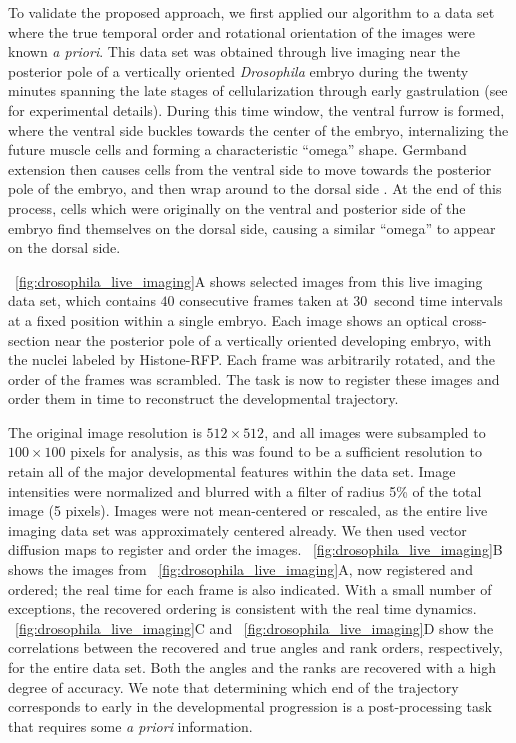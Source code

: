 To validate the proposed approach, we first applied our algorithm to a data set where the true temporal order and rotational orientation of the images were known {\em a priori}.
%
This data set was obtained through live imaging near the posterior pole of a vertically oriented {\it Drosophila} embryo during the twenty minutes spanning the late stages of cellularization through early gastrulation (see \cite{dsilva2015temporal} for experimental details).
%
During this time window, the ventral furrow is formed, where the ventral side buckles towards the center of the embryo, internalizing the future muscle cells and forming a characteristic ``omega'' shape.
%
Germband extension then causes cells from the ventral side to move towards the posterior pole of the embryo, and then wrap around to the dorsal side \citep{leptin2005gastrulation}.
%
At the end of this process, cells which were originally on the ventral and posterior side of the embryo find themselves on the dorsal side, causing a similar ``omega'' to appear on the dorsal side.

\fig~\ref{fig:drosophila_live_imaging}A shows selected images from this live imaging data set, which contains $40$ consecutive frames taken at $30$~second time intervals at a fixed position within a single embryo.
%
Each image shows an optical cross-section near the posterior pole of a vertically oriented developing embryo, with the nuclei labeled by Histone-RFP.
%
Each frame was arbitrarily rotated, and the order of the frames was scrambled.
%
The task is now to register these images and order them in time to reconstruct the developmental trajectory.

The original image resolution is $512 \times 512$, and all images were subsampled to $100 \times 100$ pixels for analysis, as this was found to be a sufficient resolution to retain all of the major developmental features within the data set.
%
Image intensities were normalized and blurred with a filter of radius 5\% of the total image (5 pixels).
%
Images were not mean-centered or rescaled, as the entire live imaging data set was approximately centered already.
%
We then used vector diffusion maps to register and order the images.
%
\fig~\ref{fig:drosophila_live_imaging}B shows the images from \fig~\ref{fig:drosophila_live_imaging}A, now registered and ordered; the real time for each frame is also indicated.
%
With a small number of exceptions, the recovered ordering is consistent with the real time dynamics.
%
\fig~\ref{fig:drosophila_live_imaging}C and \fig~\ref{fig:drosophila_live_imaging}D  show the correlations between the recovered and true angles and rank orders, respectively, for the entire data set.
%
Both the angles and the ranks are recovered with a high degree of accuracy.
%
We note that determining which end of the trajectory corresponds to early in the developmental progression is a post-processing task that requires some {\em a priori} information.

